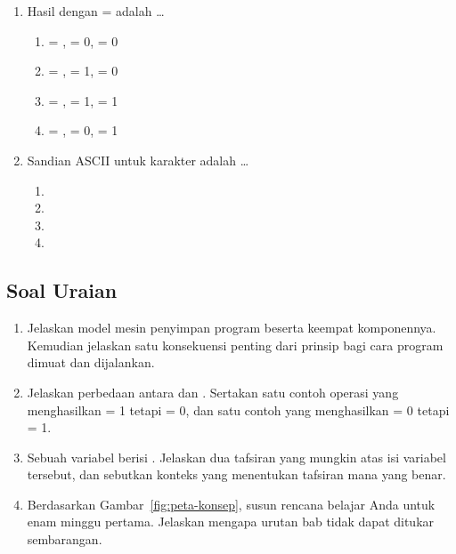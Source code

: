 \begin{enumerate}
    \item Hasil  dengan  =  adalah
          \dots
          \begin{enumerate}
              \item {} = ,  = 0,
                     = 0
              \item {} = ,  = 1,
                     = 0
              \item {} = ,  = 1,
                     = 1
              \item {} = ,  = 0,
                     = 1
          \end{enumerate}

    \item Sandian ASCII untuk karakter  adalah \dots
          \begin{enumerate}
              \item {} \item {}
              \item {} \item {}
          \end{enumerate}
\end{enumerate}

\subsection{Soal Uraian}

\begin{enumerate}
    \item Jelaskan model mesin penyimpan program beserta keempat
          komponennya. Kemudian jelaskan satu konsekuensi penting
          dari prinsip  bagi cara program dimuat
          dan dijalankan.

    \item Jelaskan perbedaan antara  dan .
          Sertakan satu contoh operasi yang menghasilkan  = 1
          tetapi  = 0, dan satu contoh yang menghasilkan
           = 0 tetapi  = 1.

    \item Sebuah variabel berisi . Jelaskan dua tafsiran yang
          mungkin atas isi variabel tersebut, dan sebutkan konteks
          yang menentukan tafsiran mana yang benar.

    \item Berdasarkan Gambar~\ref{fig:peta-konsep}, susun rencana
          belajar Anda untuk enam minggu pertama. Jelaskan mengapa
          urutan bab tidak dapat ditukar sembarangan.
\end{enumerate}

